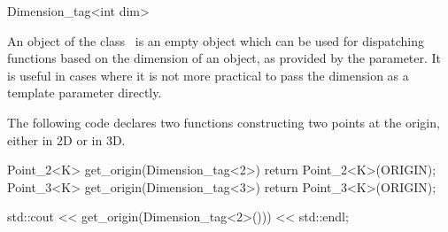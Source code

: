 \begin{ccRefClass} {Dimension_tag<int dim>}

\ccDefinition
An object of the class \ccRefName\ is an empty object which can be used
for dispatching functions based on the dimension of an object, as provided
by the  parameter.  It is useful in cases where it is not more
practical to pass the dimension as a template parameter directly.


\ccConstants


\ccExample

The following code declares two functions constructing two points at the origin,
either in 2D or in 3D.

\begin{cprog}
  Point_2<K> get_origin(Dimension_tag<2>) { return Point_2<K>(ORIGIN); }
  Point_3<K> get_origin(Dimension_tag<3>) { return Point_3<K>(ORIGIN); }

  std::cout << get_origin(Dimension_tag<2>())) << std::endl;
\end{cprog}

\ccSeeAlso
{} \\
 \\

\end{ccRefClass}
